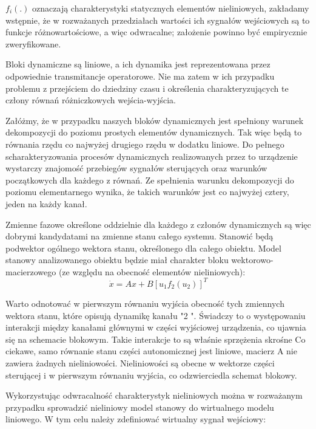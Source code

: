 \documentclass{article}
\begin{document}
		$ f_i(.) $ oznaczają charakterystyki statycznych elementów nieliniowych, zakładamy wstępnie,
		że w rozważanych przedziałach wartości ich sygnałów wejściowych są to funkcje
		różnowartościowe, a więc odwracalne; założenie powinno być empirycznie zweryfikowane.

		Bloki dynamiczne są liniowe, a ich dynamika jest reprezentowana przez odpowiednie
		transmitancje operatorowe. Nie ma zatem w ich przypadku problemu z przejściem do
		dziedziny czasu i określenia charakteryzujących te człony równań różniczkowych 
		wejścia-wyjścia.

		Załóżmy, że w przypadku naszych bloków dynamicznych jest spełniony warunek dekompozycji 
		do poziomu prostych elementów dynamicznych. Tak więc będą to równania rzędu co najwyżej
		drugiego rzędu w dodatku liniowe. Do pełnego scharakteryzowania procesów dynamicznych
		realizowanych przez to urządzenie wystarczy znajomość przebiegów sygnałów sterujących
		oraz warunków początkowych dla każdego z równań. Ze spełnienia warunku
		dekompozycji do poziomu elementarnego wynika, że takich warunków jest co najwyżej
		cztery, jeden na każdy kanał.

		Zmienne fazowe określone oddzielnie dla każdego z członów dynamicznych są więc dobrymi
		kandydatami na zmienne stanu całego systemu. Stanowić będą podwektor ogólnego wektora
		stanu, określonego dla całego obiektu. Model stanowy analizowanego obiektu będzie miał
		charakter bloku wektorowo-macierzowego (ze względu na obecność elementów
		nieliniowych):
		\begin{equation}
			\dot{x} = Ax+B[u_1 f_2(u_2)]^T
		\end{equation}

		Warto odnotować w pierwszym równaniu wyjścia obecność tych zmiennych wektora stanu,
		które opisują dynamikę kanału "2 ". Świadczy to o występowaniu interakcji między
		kanałami głównymi w części wyjściowej urządzenia, co
		ujawnia się na schemacie blokowym. Takie interakcje to są właśnie sprzężenia skrośne
		Co ciekawe, samo równanie stanu części autonomicznej jest liniowe, macierz A nie zawiera żadnych
		nieliniowości. Nieliniowości są obecne w wektorze
		części sterującej i w pierwszym równaniu wyjścia, co odzwierciedla schemat blokowy.

		Wykorzystując odwracalność charakterystyk nieliniowych można w rozważanym przypadku
		sprowadzić nieliniowy model stanowy do wirtualnego modelu liniowego. W tym celu należy
		zdefiniować wirtualny sygnał wejściowy:
\end{document}

